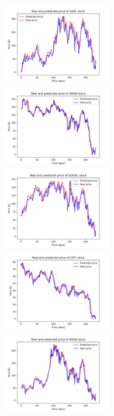 \begin{figure}
\includegraphics[width=0.5\textwidth]{./graf/model3/AAPL.png}
\includegraphics[width=0.5\textwidth]{./graf/model3/AMZN.png}
\includegraphics[width=0.5\textwidth]{./graf/model3/GOOGL.png}
\includegraphics[width=0.5\textwidth]{./graf/model3/LYFT.png}
\includegraphics[width=0.5\textwidth]{./graf/model3/NVDA.png}

\end{figure}
